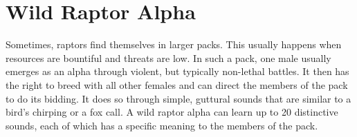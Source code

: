 \section{Wild Raptor Alpha}

Sometimes, raptors find themselves in larger packs. This usually happens when resources are bountiful and threats are low. In such a pack, one male usually emerges as an alpha through violent, but typically non-lethal battles. It then has the right to breed with all other females and can direct the members of the pack to do its bidding. It does so through simple, guttural sounds that are similar to a bird's chirping or a fox call. A wild raptor alpha can learn up to 20 distinctive sounds, each of which has a specific meaning to the members of the pack.